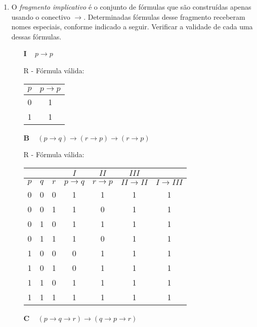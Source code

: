\documentclass[12pt,a4paper,oneside]{article}
\begin{document}
\begin{enumerate}
\begin{enumerate}
		\end{enumerate}
		
	\item O {\it fragmento implicativo} é o conjunto de fórmulas que são construídas apenas usando o conectivo $\rightarrow$. Determinadas fórmulas desse fragmento receberam nomes especiais, conforme indicado a seguir. Verificar a validade de cada uma dessas fórmulas.
	
		\begin{enumerate}
			\item[\bf I] \mbox{ } $p \rightarrow p$ 			
			
			{\color{verde} R - Fórmula válida:
			\begin{center}
				\begin{tabular}{c|c}
					$p$ & $p \rightarrow p$ \\ 
					\hline
					0 & 1 \\ 
					1 & 1 \\ 
					\hline 
				\end{tabular}
			\end{center} 
			}
			
			\item[\bf B] \mbox{ } $(p \rightarrow q) \rightarrow (r \rightarrow p) \rightarrow (r \rightarrow p)$
			
			{\color{verde} R - Fórmula válida:
			\begin{center}
				\begin{tabular}{ccc|c|c|c|c}
				 &  &  & $I$ & $II$ & $III$ &  \\ 
				\hline 
				$p$ & $q$ & $r$ & $p \rightarrow q$ & $r \rightarrow p$ & $II \rightarrow II$ & $I \rightarrow III$ \\ 
				\hline 
				0 & 0 & 0 & 1 & 1 & 1 & 1 \\ 
				0 & 0 & 1 & 1 & 0 & 1 & 1 \\ 
				0 & 1 & 0 & 1 & 1 & 1 & 1 \\ 
				0 & 1 & 1 & 1 & 0 & 1 & 1 \\ 
				1 & 0 & 0 & 0 & 1 & 1 & 1 \\ 
				1 & 0 & 1 & 0 & 1 & 1 & 1 \\ 
				1 & 1 & 0 & 1 & 1 & 1 & 1 \\ 
				1 & 1 & 1 & 1 & 1 & 1 & 1 \\ 
				\hline 
				\end{tabular}  
			\end{center} 
			}
			\item[\bf C] \mbox{ } $(p \rightarrow q \rightarrow r) \rightarrow (q \rightarrow p \rightarrow r)$
			

\end{enumerate}
\end{enumerate}
\end{document}
